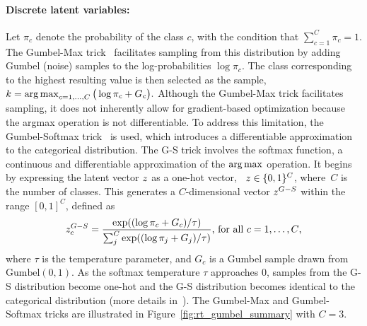 \paragraph{Discrete latent variables:}
Let $\pi_c$ denote the probability of the class $c$, with the condition that
$\sum_{c=1}^C \pi_c = 1$. The Gumbel-Max trick~\citep{gumbel1948statistical,
maddison2014sampling} facilitates sampling from this
distribution by adding \iid  Gumbel (noise) samples to the
log-probabilities $\log \pi_c$.
The class corresponding to the highest resulting value is then selected as the
sample, \ie~$ k = \operatorname*{arg\,max}_{c = 1, \dots, C} \big( \log \pi_c + G_c \big) \text{.}$
Although the Gumbel-Max trick facilitates sampling, it does not inherently allow
for gradient-based optimization because the argmax operation is not
differentiable. 
To address this limitation, the Gumbel-Softmax
trick~\citep{maddison2016concrete, jang2016categorical} is used, which 
introduces a differentiable approximation to the
categorical distribution.
The G-S trick involves the softmax function, a continuous and
differentiable approximation of the $\operatorname*{arg\,max}$ operation. It begins by
expressing the latent vector $z$ as a one-hot vector, 
\ie~$z \in \{0,1\}^C$, where~$C$ is the number of classes.
This  generates a $C$-dimensional vector $z^{G-S}$ 
within the range $[0,1]^C$, defined as
\begin{equation*}
    \label{eq:gumbel_softmax}
    z^{G-S}_{c}  = \frac{\exp((\log\pi_c + G_c)/\tau)}
    {\sum_{j}^{C}\exp((\log\pi_j + G_j)/\tau)} 
    \text{, for all } c = 1, \dots, C \text{,}
\end{equation*}
where $\tau$ is the temperature parameter, and $G_c$ is a Gumbel sample 
drawn from $\text{Gumbel}(0,1)$.
As the softmax temperature $\tau$ approaches  $0$, 
samples from the G-S distribution become one-hot and 
the G-S distribution becomes identical to the categorical distribution (more details 
in~\cite{maddison2016concrete}). 
The Gumbel-Max and Gumbel-Softmax tricks are illustrated in Figure~\ref{fig:rt_gumbel_summary}
with $C=3$. 


